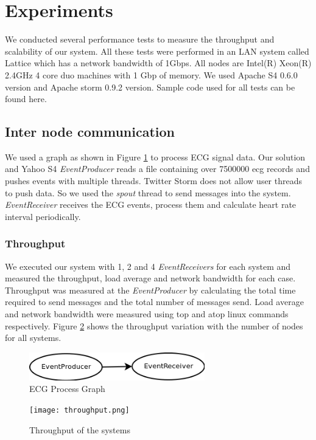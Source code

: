 \section{Experiments}

We conducted several performance tests to measure the throughput and scalability of our system. All these tests were performed in an LAN system called Lattice which has a network bandwidth of 1Gbps. All nodes are Intel(R) Xeon(R) 2.4GHz 4 core duo machines with 1 Gbp of memory. We used Apache S4 0.6.0 version and Apache storm 0.9.2 version. Sample code used for all tests can be found here\cite{solutionCode}.


\subsection{Inter node communication}
We used a graph as shown in Figure \ref{ecgGraph} to process ECG signal data. Our solution and Yahoo S4\cite{neumeyer2010s4} \textit{EventProducer} reads a file containing over 7500000 ecg records and pushes events with multiple threads. Twitter Storm\cite{twitterStorm} does not allow user threads to push data. So we used the \textit{spout} thread to send messages into the system. \textit{EventReceiver}  receives the ECG events, process them and calculate heart rate interval periodically.  
\subsubsection{Throughput}
We executed our system with 1, 2 and 4  \textit{EventReceivers} for each system and measured the throughput, load average and network bandwidth  for each case. Throughput was measured at the \textit{EventProducer} by calculating the total time required to send messages and the total number of messages send. Load average and network bandwidth were measured using top and atop linux commands respectively. Figure \ref{throuput} shows the throughput variation with the number of nodes for all systems. 

\begin{figure}[!t]
        \centering
        \includegraphics[width=3.0in]{ecgGraph.png}
        \caption{ECG Process Graph}
        \label{ecgGraph}
\end{figure}
\begin{figure}[!t]
        \centering
        \texttt{[image: throughput.png]}
        \caption{Throughput of the systems}
        \label{throuput}
\end{figure}

